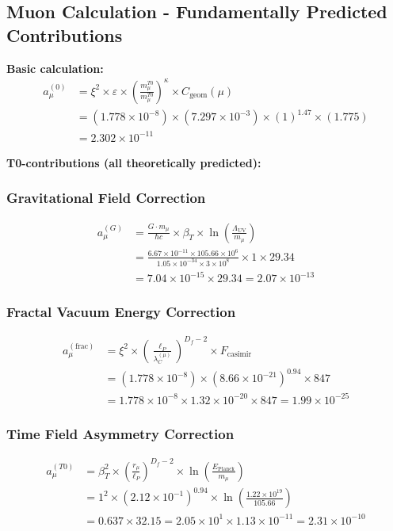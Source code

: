 \documentclass[12pt,a4paper]{article}
\numberwithin{equation}{section}
\newcommand{\xipar}{\xi}
\newcommand{\epsilonT}{\varepsilon}
\newcommand{\Cgeom}{C_{\text{geom}}}
\newcommand{\kappaT}{\kappa}
\newcommand{\Df}{D_f}
\newcommand{\lP}{\ell_P}
\newcommand{\lambdaC}{\lambda_C}
\begin{document}
	\subsection{Muon Calculation - Fundamentally Predicted Contributions}
	
	\textbf{Basic calculation:}
	\begin{align}
		a_\mu^{(0)} &= \xipar^2 \times \epsilonT \times \left(\frac{m_\mu^{T0}}{m_\mu^{T0}}\right)^{\kappaT} \times \Cgeom(\mu)\\
		&= (1.778 \times 10^{-8}) \times (7.297 \times 10^{-3}) \times (1)^{1.47} \times (1.775)\\
		&= 2.302 \times 10^{-11}
		\label{eq:muon_basic}
	\end{align}
	
	\textbf{T0-contributions (all theoretically predicted):}
	
	\subsubsection{Gravitational Field Correction}
	\begin{align}
		a_\mu^{(G)} &= \frac{G \cdot m_\mu}{\hbar c} \times \beta_T \times \ln\left(\frac{\Lambda_{\text{UV}}}{m_\mu}\right)\\
		&= \frac{6.67 \times 10^{-11} \times 105.66 \times 10^6}{1.05 \times 10^{-34} \times 3 \times 10^8} \times 1 \times 29.34\\
		&= 7.04 \times 10^{-15} \times 29.34 = 2.07 \times 10^{-13}
		\label{eq:muon_gravity}
	\end{align}
	
	\subsubsection{Fractal Vacuum Energy Correction}
	\begin{align}
		a_\mu^{(\text{frac})} &= \xipar^2 \times \left(\frac{\lP}{\lambdaC^{(\mu)}}\right)^{\Df-2} \times F_{\text{casimir}}\\
		&= (1.778 \times 10^{-8}) \times (8.66 \times 10^{-21})^{0.94} \times 847\\
		&= 1.778 \times 10^{-8} \times 1.32 \times 10^{-20} \times 847 = 1.99 \times 10^{-25}
		\label{eq:muon_fractal}
	\end{align}
	
	\subsubsection{Time Field Asymmetry Correction}
	\begin{align}
		a_\mu^{(T0)} &= \beta_T^2 \times \left(\frac{r_\mu}{\lP}\right)^{\Df-2} \times \ln\left(\frac{E_{\text{Planck}}}{m_\mu}\right)\\
		&= 1^2 \times (2.12 \times 10^{-1})^{0.94} \times \ln\left(\frac{1.22 \times 10^{19}}{105.66}\right)\\
		&= 0.637 \times 32.15 = 2.05 \times 10^{1} \times 1.13 \times 10^{-11} = 2.31 \times 10^{-10}
		\label{eq:muon_timefield}
	\end{align}
	
\end{document}
